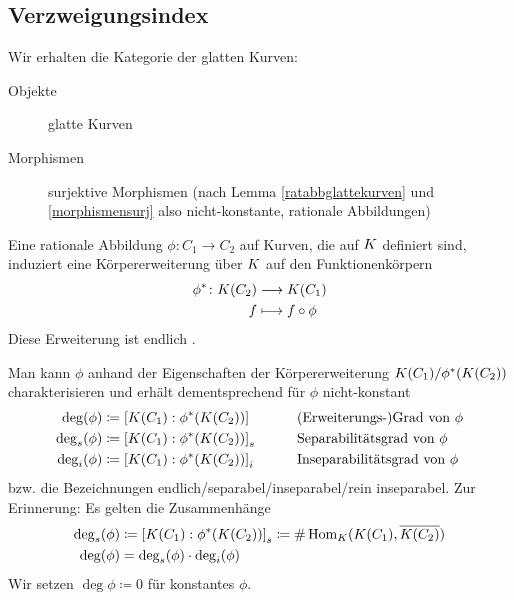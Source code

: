 
\subsection{Verzweigungsindex}
\begin{Bemerkung}
  Wir erhalten die Kategorie der glatten Kurven:
  \begin{description}
  \item[Objekte] glatte Kurven
  \item[Morphismen] surjektive Morphismen (nach Lemma
    \ref{ratabbglattekurven} und \ref{morphismensurj} also
    nicht-konstante, rationale Abbildungen)
  \end{description}
\end{Bemerkung}

\begin{LemmaDefinition}\label{funktionenkoerper}
  Eine rationale Abbildung $\phi\colon C_1\to C_2$ auf Kurven, die auf
  $K$ definiert sind,
  induziert eine Körpererweiterung über $K$ auf den Funktionenkörpern
  \begin{align*}
    \phi^* \colon K(C_2) &\longrightarrow K(C_1)\\
    f &\longmapsto f\circ \phi
  \end{align*}
  Diese Erweiterung ist endlich
  \cite[siehe][Theorem II.2.4 (a)]{silverman}.

  Man kann $\phi$ anhand der Eigenschaften der Körpererweiterung
  $K(C_1)/\phi^*(K(C_2))$ charakterisieren und erhält
  dementsprechend für $\phi$ nicht-konstant
  \begin{alignat*}{2}
    \deg(\phi) &\coloneqq \left[ K(C_1) : \phi^*(K(C_2)) \right]
    \qquad&&\text{(Erweiterungs-)Grad von }\phi\\
    \operatorname{\deg}_s(\phi) &\coloneqq \left[ K(C_1) : \phi^*(K(C_2)) \right]_s
    \qquad&&\text{Separabilitätsgrad von }\phi\\
    \operatorname{\deg}_i(\phi) &\coloneqq \left[ K(C_1) : \phi^*(K(C_2)) \right]_i
    \qquad&&\text{Inseparabilitätsgrad von }\phi
  \end{alignat*}
  bzw. die Bezeichnungen endlich/separabel/inseparabel/rein
  inseparabel. Zur Erinnerung: Es gelten die Zusammenhänge
  \begin{align*}
    \operatorname{\deg}_s(\phi) 
    &\coloneqq \left[ K(C_1) : \phi^*(K(C_2)) \right]_s
    \coloneqq \#\operatorname{Hom}_K(K(C_1), \overline{K(C_2)})\\
    \deg(\phi) &= \operatorname{\deg}_s(\phi)\cdot\operatorname{\deg}_i(\phi)
  \end{align*}
  Wir setzen $\deg\phi\coloneqq 0$ für konstantes $\phi$.
\end{LemmaDefinition}

